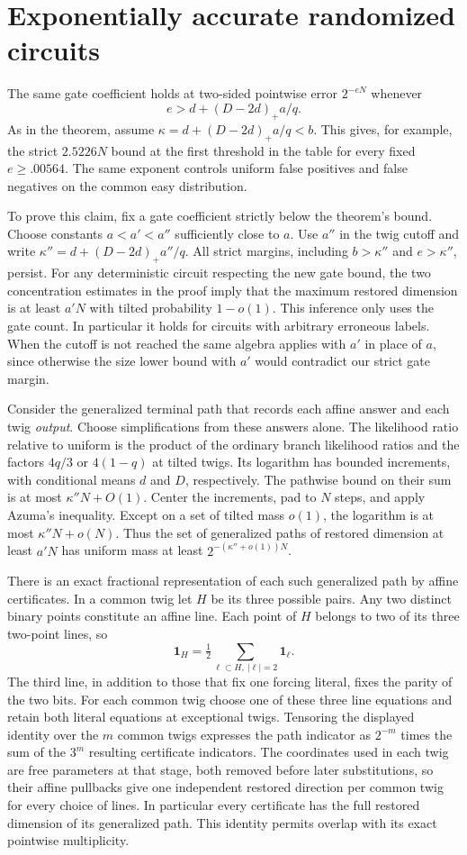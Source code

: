 \section*{Exponentially accurate randomized circuits}
The same gate coefficient holds at two-sided pointwise error
$2^{-eN}$ whenever
\[
 e>d+(D-2d)_+a/q.
\]
As in the theorem, assume $\kappa=d+(D-2d)_+a/q<b$. This gives,
for example, the strict $2.5226N$ bound at the first threshold in
the table for every fixed $e\ge .00564$. The same exponent controls uniform false positives and false negatives
on the common easy distribution.

To prove this claim, fix a gate coefficient strictly below the
theorem's bound. Choose constants $a<a'<a''$ sufficiently close to
$a$. Use $a''$ in the twig cutoff and write
$\kappa''=d+(D-2d)_+a''/q$. All strict margins, including
$b>\kappa''$ and $e>\kappa''$, persist. For any
deterministic circuit respecting the new gate bound, the two
concentration estimates in the proof imply that the maximum restored
dimension is at least $a'N$ with tilted probability $1-o(1)$.
This inference only uses the gate count. In particular it holds for
circuits with arbitrary erroneous labels. When the cutoff is not
reached the same algebra applies with $a'$ in place of $a$, since
otherwise the size lower bound with $a'$ would contradict our strict
gate margin.

Consider the generalized terminal path that records each affine
answer and each twig \emph{output}. Choose simplifications from these
answers alone. The likelihood ratio relative to uniform is the
product of the ordinary branch likelihood ratios and the factors
$4q/3$ or $4(1-q)$ at tilted twigs. Its logarithm has bounded
increments, with conditional means $d$ and $D$, respectively.
The pathwise bound on their sum is at most $\kappa''N+O(1)$.
Center the increments, pad to $N$ steps, and apply Azuma's inequality.
Except on a set of tilted mass $o(1)$, the logarithm is at most
$\kappa''N+o(N)$. Thus the set of generalized paths of restored
dimension at least $a'N$ has uniform mass at least
$2^{-(\kappa''+o(1))N}$.

There is an exact fractional representation of each such generalized
path by affine certificates. In a common twig let $H$ be its three
possible pairs. Any two distinct binary points constitute an affine
line. Each point of $H$ belongs to two of its three two-point lines, so
\[
 \mathbf 1_H=\tfrac12\sum_{\ell\subset H,\ |\ell|=2}\mathbf 1_\ell .
\]
The third line, in addition to those that fix one forcing literal,
fixes the parity of the two bits. For each common twig choose one
of these three line equations and retain both literal equations at
exceptional twigs. Tensoring the displayed identity over the $m$
common twigs expresses the path indicator as $2^{-m}$ times the sum
of the $3^m$ resulting certificate indicators. The coordinates used
in each twig are free parameters at that stage, both removed before
later substitutions, so their affine pullbacks give one independent
restored direction per common twig for every choice of lines. In
particular every certificate has the full restored dimension of its
generalized path. This identity permits overlap with its exact
pointwise multiplicity.

